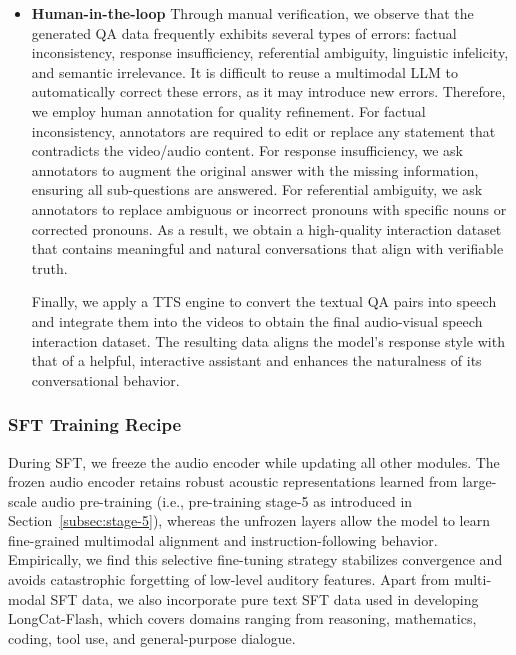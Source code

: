 \documentclass{article}
\begin{document}
\begin{itemize}
\item \textbf{Human-in-the-loop} %
Through manual verification, we observe that the generated QA data frequently exhibits several types of errors: factual inconsistency, response insufficiency, referential ambiguity, linguistic infelicity, and semantic irrelevance.
It is difficult to reuse a multimodal LLM to automatically correct these errors, as it may introduce new errors. Therefore, we employ human annotation for quality refinement.
For factual inconsistency, annotators are required to edit or replace any statement that contradicts the video/audio content. For response insufficiency, we ask annotators to augment the original answer with the missing information, ensuring all sub-questions are answered. For referential ambiguity, we ask annotators to replace ambiguous or incorrect pronouns with specific nouns or corrected pronouns. As a result, we obtain a high-quality interaction dataset that contains meaningful and natural conversations that align with verifiable truth.

Finally, we apply a TTS engine to convert the textual QA pairs into speech and integrate them into the videos to obtain the final audio-visual speech interaction dataset. The resulting data aligns the model’s response style with that of a helpful, interactive assistant and enhances the naturalness of its conversational behavior.

\end{itemize}

\subsubsection{SFT Training Recipe}

During SFT, we freeze the audio encoder while updating all other modules. The frozen audio encoder retains robust acoustic representations learned from large-scale audio pre-training (i.e., pre-training stage-5 as introduced in Section~\ref{subsec:stage-5}), whereas the unfrozen layers allow the model to learn fine-grained multimodal alignment and instruction-following behavior. Empirically, we find this selective fine-tuning strategy stabilizes convergence and avoids catastrophic forgetting of low-level auditory features. Apart from multi-modal SFT data, we also incorporate pure text SFT data used in developing LongCat-Flash, which covers domains ranging from reasoning, mathematics, coding, tool use, and general-purpose dialogue.
\end{document}
